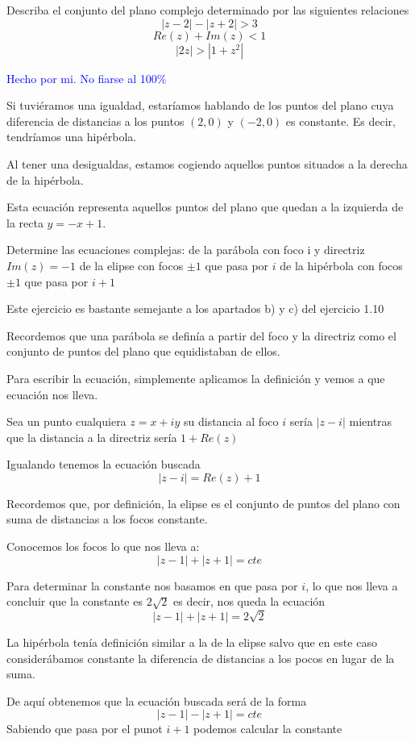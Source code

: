 \begin{problem}[16]
Describa el conjunto del plano complejo determinado por las siguientes relaciones
\ppart
\[|z-2|-|z+2| > 3\]
\ppart
\[Re(z)+Im(z) < 1\]
\ppart
\[|2z|>|1+z^2|\]

\solution
\textcolor{blue}{Hecho por mi. No fiarse al 100\%}

\spart
Si tuviéramos una igualdad, estaríamos hablando de los puntos del plano cuya diferencia de distancias a los puntos $(2,0)$ y $(-2,0)$ es constante. Es decir, tendríamos una hipérbola.

Al tener una desigualdas, estamos cogiendo aquellos puntos situados a la derecha de la hipérbola.

\spart

Esta ecuación representa aquellos puntos del plano que quedan a la izquierda de la recta $y=-x+1$.

\spart



\end{problem}

\begin{problem}[17]
Determine las ecuaciones complejas:
\ppart de la parábola con foco i y directriz $Im(z)=-1$
\ppart de la elipse con focos $\pm 1$ que pasa por $i$
\ppart de la hipérbola con focos $\pm 1$ que pasa por $i+1$

\solution

Este ejercicio es bastante semejante a los apartados b) y c) del ejercicio 1.10

\spart
Recordemos que una parábola se definía a partir del foco y la directriz como el conjunto de puntos del plano que equidistaban de ellos.

Para escribir la ecuación, simplemente aplicamos la definición y vemos a que ecuación nos lleva.

Sea un punto cualquiera $z=x+iy$ su distancia al foco $i$ sería $|z-i|$ mientras que la distancia a la directriz sería $1+Re(z)$

Igualando tenemos la ecuación buscada
\[|z-i|=Re(z)+1\]

\spart
Recordemos que, por definición, la elipse es el conjunto de puntos del plano con suma de distancias a los focos constante.

Conocemos los focos lo que nos lleva a:
\[|z-1|+|z+1|=cte\]

Para determinar la constante nos basamos en que pasa por $i$, lo que nos lleva a concluir que la constante es $2\sqrt{2}$ es decir, nos queda la ecuación
\[|z-1|+|z+1|=2\sqrt{2}\]

\spart
La hipérbola tenía definición similar a la de la elipse salvo que en este caso considerábamos constante la diferencia de distancias a los pocos en lugar de la suma.

De aquí obtenemos que la ecuación buscada será de la forma
\[|z-1|-|z+1|=cte\]
Sabiendo que pasa por el punot $i+1$ podemos calcular la constante

\end{problem}

